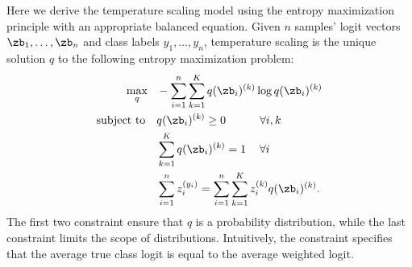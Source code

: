 
\label{sup:proof}
Here we derive the temperature scaling model using the entropy maximization principle with an appropriate balanced equation.
%
{\claim \label{max-entropy} Given $n$ samples' logit vectors $\zb_1, \ldots, \zb_n$ and class labels $y_1, \ldots, y_n$, temperature scaling is the unique solution $q$ to the following entropy maximization problem:
\begin{align*}
\max_{q} \hspace{8pt} & -\sum_{i=1}^n \sum_{k=1}^K q(\zb_i)^{(k)} \log q(\zb_i)^{(k)} \\
\text{subject to} \hspace{10pt} & q(\zb_i)^{(k)} \geq 0 \hspace{30pt} \forall i, k \\
                                & \sum_{k=1}^K q(\zb_i)^{(k)} = 1 \hspace{12pt} \forall i \\
																& \sum_{i=1}^n z_i^{(y_i)} = \sum_{i=1}^n \sum_{k=1}^K z_i^{(k)} q(\zb_i)^{(k)}.
\end{align*}}
%
The first two constraint ensure that $q$ is a probability distribution, while the last constraint limits the scope of distributions. Intuitively, the constraint specifies that the average true class logit is equal to the average weighted logit.
%
